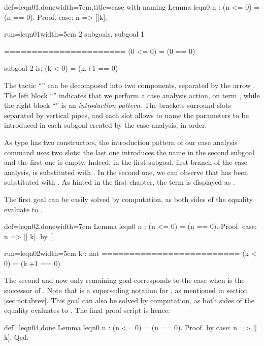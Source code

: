 \begin{coq}{def=leqn01,done}{width=7cm,title=case with naming}
Lemma leqn0 n : (n <= 0) = (n == 0).
Proof.
case: n => [|k].
$~$
$~$
\end{coq}
\begin{coqout}{run=leqn01}{width=5cm}
2 subgoals, subgoal 1

======================
  (0 <= 0) = (0 == 0)

subgoal 2 is:
 (k < 0) = (k.+1 == 0)
\end{coqout}
The tactic ``''  can be decomposed into two components,
separated by the arrow \C{=>}.  The left block ``'' indicates
that we  perform a case analysis action, on term , while the right
block ``\C{[|k]}'' is an \emph{introduction pattern}. The brackets
surround slots separated by vertical pipes, and each slot allows to
name the parameters to be introduced in each subgoal created by the
case analysis, in order.

As type  has two constructors, the introduction pattern \C{[|k]}
of our case analysis command uses two slots: the last one introduces
the name  in the second subgoal and the first one is
empty. Indeed, in the first subgoal, first branch of the case
analysis,  is substituted with . In the second one, we can
observe that  has been substituted with .
As hinted in the first chapter, the term 
is displayed as .

The first goal
can be easily solved by computation, as both sides of the equality
evaluate to .

\begin{coq}{def=leqn02,done}{width=7cm}
Lemma leqn0 n : (n <= 0) = (n == 0).
Proof.
case: n => [| k].
  by [].
\end{coq}
\begin{coqout}{run=leqn02}{width=5cm}
k : nat
=========================
  (k < 0) = (k.+1 == 0)
\end{coqout}
The second and now only remaining goal corresponds to the case when
 is the successor of . Note that  is a
superseding notation for , as mentioned in section
\ref{sec:notabrev}. This goal can also be  solved by computation, as
both sides of the equality evaluates to .  The final
proof script is hence:

\begin{coq}{def=leqn04,done}{}
Lemma leqn0 n : (n <= 0) = (n == 0).
Proof.  by case: n => [| k].  Qed.
\end{coq}
~\\

